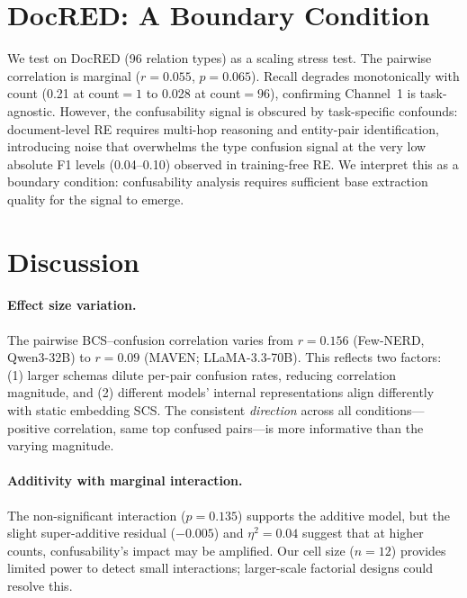 \documentclass[11pt,a4paper]{article}
\begin{document}
\section{DocRED: A Boundary Condition}
\label{sec:docred}

We test on DocRED (96 relation types) as a scaling stress test. The pairwise correlation is marginal ($r=0.055$, $p=0.065$). Recall degrades monotonically with count (0.21 at count$=1$ to 0.028 at count$=96$), confirming Channel~1 is task-agnostic. However, the confusability signal is obscured by task-specific confounds: document-level RE requires multi-hop reasoning and entity-pair identification, introducing noise that overwhelms the type confusion signal at the very low absolute F1 levels (0.04--0.10) observed in training-free RE. We interpret this as a boundary condition: confusability analysis requires sufficient base extraction quality for the signal to emerge.

\section{Discussion}
\label{sec:discussion}

\paragraph{Effect size variation.}
The pairwise BCS--confusion correlation varies from $r=0.156$ (Few-NERD, Qwen3-32B) to $r=0.09$ (MAVEN; LLaMA-3.3-70B). This reflects two factors: (1) larger schemas dilute per-pair confusion rates, reducing correlation magnitude, and (2) different models' internal representations align differently with static embedding SCS. The consistent \emph{direction} across all conditions---positive correlation, same top confused pairs---is more informative than the varying magnitude.

\paragraph{Additivity with marginal interaction.}
The non-significant interaction ($p=0.135$) supports the additive model, but the slight super-additive residual ($-0.005$) and $\eta^2=0.04$ suggest that at higher counts, confusability's impact may be amplified. Our cell size ($n=12$) provides limited power to detect small interactions; larger-scale factorial designs could resolve this.
\end{document}
